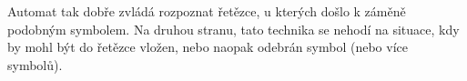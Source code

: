 \documentclass[a4paper,10pt]{article}
\begin{document}
Automat tak dobře zvládá rozpoznat řetězce, u kterých došlo k záměně podobným symbolem. Na druhou stranu, tato technika se nehodí na situace, kdy by mohl být do řetězce vložen, nebo naopak odebrán symbol (nebo více symbolů). 





\newpage


\end{document}

